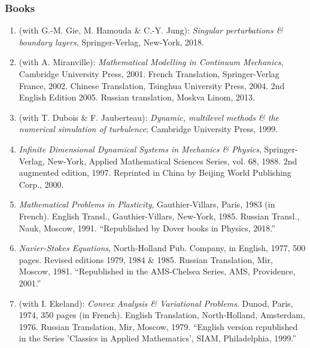 \documentclass{article}
\begin{document}
\subsubsection{Books}
\begin{enumerate}
	\item (with G.-M. Gie, M. Hamouda \& C.-Y. Jung): \textit{Singular perturbations \& boundary layers}, Springer-Verlag, New-York, 2018.
	\item (with A. Miranville): \textit{Mathematical Modelling in Continuum Mechanics}, Cambridge University Press, 2001. French Translation, Springer-Verlag France, 2002. Chinese Translation, Tsinghua University Press, 2004. 2nd English Edition 2005. Russian translation, Moskva Linom, 2013.
	\item (with T. Dubois \& F. Jauberteau): \textit{Dynamic, multilevel methods \& the numerical simulation of turbulence}; Cambridge University Press, 1999.
	\item \textit{Infinite Dimensional Dynamical Systems in Mechanics \& Physics}, Springer-Verlag, New-York, Applied Mathematical Sciences Series, vol. 68, 1988. 2nd augmented edition, 1997. Reprinted in China by Beijing World Publishing Corp., 2000.
	\item \textit{Mathematical Problems in Plasticity}, Gauthier-Villars, Paris, 1983 (in French). English Transl., Gauthier-Villars, New-York, 1985. Russian Transl., Nauk, Moscow, 1991. ``Republished by Dover books in Physics, 2018.''
	\item \textit{Navier-Stokes Equations}, North-Holland Pub. Company, in English, 1977, 500 pages. Revised editions 1979, 1984 \& 1985. Russian Translation, Mir, Moscow, 1981. ``Republished in the AMS-Chelsea Series, AMS, Providence, 2001.''
	\item (with I. Ekeland): \textit{Convex Analysis \& Variational Problems}. Dunod, Paris, 1974, 350 pages (in French). English Translation, North-Holland, Amsterdam, 1976. Russian Translation, Mir, Moscow, 1979. ``English version republished in the Series 'Classics in Applied Mathematics', SIAM, Philadelphia, 1999.''
\end{enumerate}
\end{document}
